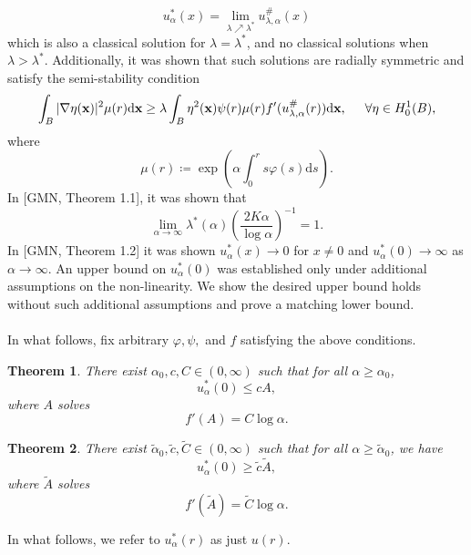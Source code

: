 \documentclass{article}
\newtheorem{thm}{Theorem}[section]
\begin{document}
    \[u_\alpha^*(x) = \lim_{\lambda\nearrow \lambda^*}u^\#_{\lambda,\alpha}(x)\]
    which is also a classical solution for $\lambda = \lambda^*$, and no classical solutions when $\lambda>\lambda^*$.
    Additionally, it was shown that such solutions are radially symmetric and satisfy the semi-stability condition
\begin{equation}
    \int_B |\nabla\eta(\textbf{x})|^2\mu(r)\mathrm{d}\textbf{x} \geq \lambda \int_B\eta^2(\mathbf x)\psi(r)\mu(r)f'(u^\#_{\lambda,\alpha}(r))\mathrm{d}\textbf{x},\hspace{.5cm}\forall \eta\in H_0^1(B),
\end{equation}
where
\begin{equation*}
    \mu(r) \coloneqq \exp\left(\alpha\int_0^r s\varphi(s)\mathrm{d}s\right).
\end{equation*}
In [GMN, Theorem 1.1], it was shown that 
\begin{equation}
    \lim_{\alpha\to\infty}\lambda^*(\alpha)\left(\frac{2K\alpha}{\log\alpha}\right)^{-1}=1.
\end{equation}
In [GMN, Theorem 1.2] it was shown $u_\alpha^*(x)\to0$ for $x\neq0$ and $u_\alpha^*(0)\to\infty$ as $\alpha\to\infty$. An upper bound on $u_\alpha^*(0)$ was established only under additional assumptions on the non-linearity. We show the desired upper bound holds without such additional assumptions and prove a matching lower bound. 
\\ \\
In what follows, fix arbitrary $\varphi, \psi,$ and $f$ satisfying the above conditions.
\begin{thm}
   There exist $\alpha_0,c,C\in (0,\infty)$ such that for all $\alpha\geq\alpha_0$, 
   \[u_\alpha^*(0)\leq cA,\]
   where $A$ solves
   \[f'(A) = C\log \alpha. %
   \]
\end{thm}
\begin{thm}
    There exist $\tilde{\alpha}_0,\tilde{c},\widetilde{C}\in(0,\infty)$ such that for all $\alpha\geq\tilde{\alpha}_0$, we have
    \[u_\alpha^*(0) \geq \tilde{c}\tilde{A},\]
    where $\tilde{A}$ solves
    \[f'(\tilde{A}) = \widetilde{C}\log \alpha.\]
\end{thm}
\noindent In what follows, we refer to $u_\alpha^*(r)$ as just $u(r)$. 
\end{document}
